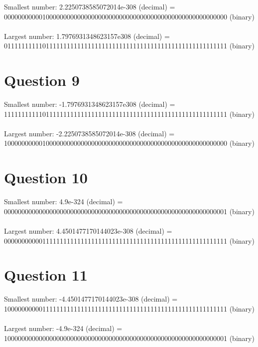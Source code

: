 \documentclass{article}
\begin{document}
Smallest number: 2.2250738585072014e-308 (decimal) = \\ 0000000000010000000000000000000000000000000000000000000000000000 (binary) \\
\\
Largest number: 1.7976931348623157e308 (decimal) = \\ 0111111111101111111111111111111111111111111111111111111111111111 (binary) \\


\section{Question 9}

Smallest number: -1.7976931348623157e308 (decimal) = \\ 1111111111101111111111111111111111111111111111111111111111111111 (binary) \\
\\
Largest number: -2.2250738585072014e-308 (decimal) = \\ 1000000000010000000000000000000000000000000000000000000000000000 (binary) \\


\section{Question 10}

Smallest number: 4.9e-324 (decimal) = \\ 0000000000000000000000000000000000000000000000000000000000000001 (binary) \\
\\
Largest number: 4.4501477170144023e-308 (decimal) = \\ 0000000000011111111111111111111111111111111111111111111111111111 (binary) \\


\section{Question 11}

Smallest number: -4.4501477170144023e-308 (decimal) = \\ 1000000000011111111111111111111111111111111111111111111111111111 (binary) \\
\\
Largest number: -4.9e-324 (decimal) = \\ 1000000000000000000000000000000000000000000000000000000000000001 (binary) \\
\end{document}
